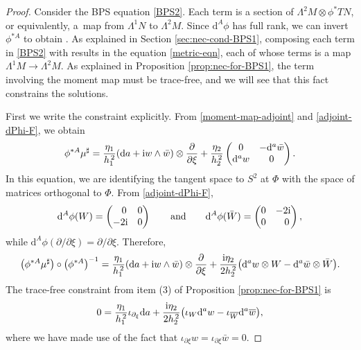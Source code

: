 \documentclass[10pt,a4paper]{amsart}
\newcommand{\1}{{\mathbb{1}}}
\def \d{\mathrm{d}}
\newcommand{\ol}{\overline}
\numberwithin{equation}{section}
\begin{document}
\begin{proof}
Consider the BPS equation \eqref{BPS2}. Each term is a section of $\Lambda^2M\otimes\phi^\ast TN$, or equivalently, a~map from $\Lambda^1N$ to $\Lambda^2M$. Since $\d^A\phi$ has full rank, we can invert $\phi^{\ast A}$ to obtain . As explained in Section \ref{sec:nec-cond-BPS1}, composing each term in \eqref{BPS2} with  results in the equation \eqref{metric-eqn}, each of whose terms is a map $\Lambda^1M\to\Lambda^2M$. As explained in Proposition \ref{prop:nec-for-BPS1}, the term involving the moment map must be trace-free, and we will see that this fact constrains the solutions.

First we write the constraint explicitly. From \eqref{moment-map-adjoint} and \eqref{adjoint-dPhi-F}, we obtain
\begin{equation*}
\phi^{\ast A}\mu^\sharp = \frac{\eta_1}{h_1^{\,2}}(\d a+{\rm i}w\wedge\bar{w})\otimes\frac{\partial}{\partial\xi}+\frac{\eta_2}{h_2^{\,2}}\begin{pmatrix}0 & -\d^a\bar{w} \\ \d^a w & 0 \end{pmatrix}.
\end{equation*}
In this equation, we are identifying the tangent space to $S^2$ at $\Phi$ with the space of matrices orthogonal to $\Phi$. From \eqref{adjoint-dPhi-F},
\begin{equation*}
\d^A\phi(W)=\begin{pmatrix}\hphantom{-} 0&0\\-2{\rm i}&0\end{pmatrix} \qquad\text{and}\qquad
\d^A\phi(\bar{W})=\begin{pmatrix}0&-2{\rm i}\\0&\hphantom{-}0\end{pmatrix},
\end{equation*}
while $\d^A\phi(\partial/\partial\xi)=\partial/\partial\xi$. Therefore,
\begin{equation*}
\big(\phi^{\ast A}\mu^\sharp\big)\circ \big(\phi^{\ast A}\big)^{-1} = \frac{\eta_1}{h_1^{\,2}}(\d a+{\rm i}w\wedge\bar{w})\otimes\frac{\partial}{\partial\xi}+\frac{{\rm i}\eta_2}{2h_2^{\,2}}\big(\d^a w\otimes W -\d^a\bar{w}\otimes\bar{W}\big).
\end{equation*}
The trace-free constraint from item (3) of Proposition \ref{prop:nec-for-BPS1} is
\begin{equation}
\label{adjoint-tracefree}
0 = \frac{\eta_1}{h_1^{\,2}}\iota_{\partial_\xi}\d a + \frac{{\rm i}\eta_2}{2h_2^{\,2}}\big(\iota_W\d^a w -\iota_{\ol{W}}\d^a\ol{w}\big),
\end{equation}
where we have made use of the fact that $\iota_{\partial\xi}w=\iota_{\partial\xi}\bar{w}=0$.


\end{proof}
\end{document}
